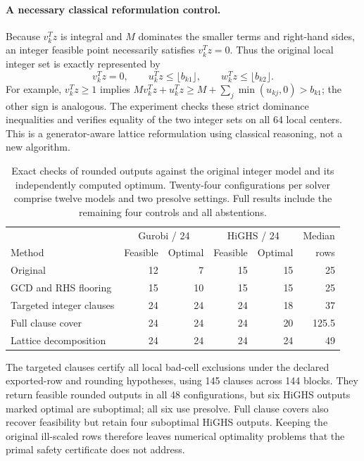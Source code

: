 \documentclass[11pt]{article}
\begin{document}
\paragraph{A necessary classical reformulation control.}
Because $v_k^Tz$ is integral and $M$ dominates the smaller terms and right-hand
sides, an integer feasible point necessarily satisfies $v_k^Tz=0$. Thus the
original local integer set is exactly represented by
\[
 v_k^Tz=0,\qquad u_k^Tz\le\lfloor b_{k1}\rfloor,
 \qquad w_k^Tz\le\lfloor b_{k2}\rfloor.
\]
For example, $v_k^Tz\ge1$ implies
$M v_k^Tz+u_k^Tz\ge M+\sum_j\min(u_{kj},0)>b_{k1}$; the other sign is analogous.
The experiment checks these strict dominance inequalities and verifies equality of
the two integer sets on all 64 local centers. This is a generator-aware lattice
reformulation using classical reasoning, not a new algorithm.

\begin{table}[ht]
\centering\small
\begin{tabular}{lrrrrr}
\toprule
&\multicolumn{2}{c}{Gurobi / 24}&\multicolumn{2}{c}{HiGHS / 24}&Median\\
Method&Feasible&Optimal&Feasible&Optimal&rows\\
\midrule
Original&12&7&15&15&25\\
GCD and RHS flooring&15&10&15&15&25\\
Targeted integer clauses&24&24&24&18&37\\
Full clause cover&24&24&24&20&125.5\\
Lattice decomposition&24&24&24&24&49\\
\bottomrule
\end{tabular}
\caption{Exact checks of rounded outputs against the original integer model and
its independently computed optimum. Twenty-four configurations per solver comprise
twelve models and two presolve settings. Full results include the remaining four
controls and all abstentions.}
\end{table}

The targeted clauses certify all local bad-cell exclusions under the declared
exported-row and rounding hypotheses, using 145 clauses across 144 blocks.
They return feasible rounded outputs in all 48 configurations, but six HiGHS
outputs marked optimal are suboptimal; all six use presolve. Full clause covers
also recover feasibility but retain four suboptimal HiGHS outputs. Keeping the
original ill-scaled rows therefore leaves numerical optimality problems that the
primal safety certificate does not address.
\end{document}
